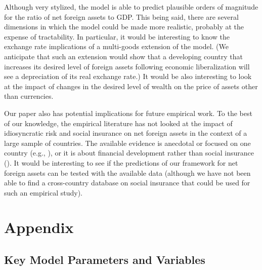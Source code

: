 \documentclass[titlepage,abstract,letterpaper]{econtex}
\begin{document}
Although very stylized, the model is able to predict plausible orders
of magnitude for the ratio of net foreign assets to GDP. This being
said, there are several dimensions in which the model could be made
more realistic, probably at the expense of tractability. In
particular, it would be interesting to know the exchange rate
implications of a multi-goods extension of the model. (We anticipate
that such an extension would show that a developing country that
increases its desired level of foreign assets following economic
liberalization will see a depreciation of its real exchange rate.)  It
would be also interesting to look at the impact of changes in the
desired level of wealth on the price of assets other than currencies.

Our paper also has potential implications for future empirical
work. To the best of our knowledge, the empirical literature has not
looked at the impact of idiosyncratic risk and social insurance on net
foreign assets in the context of a large sample of countries. The available
evidence is anecdotal or focused on one country (e.g.,
\cite{cpChina}), or it is about financial development rather than
social insurance (\cite{mqrImbal}). It would be interesting to see if
the predictions of our framework for net foreign assets can be tested
with the available data (although we have not been able to find a cross-country
database on social insurance that could be used for such an empirical study).


\pagebreak\appendix
\setcounter{section}{0}
\setcounter{subsection}{0}

\section{Appendix}

\subsection{Key Model Parameters and Variables}
\label{AppDef}
\end{document}

